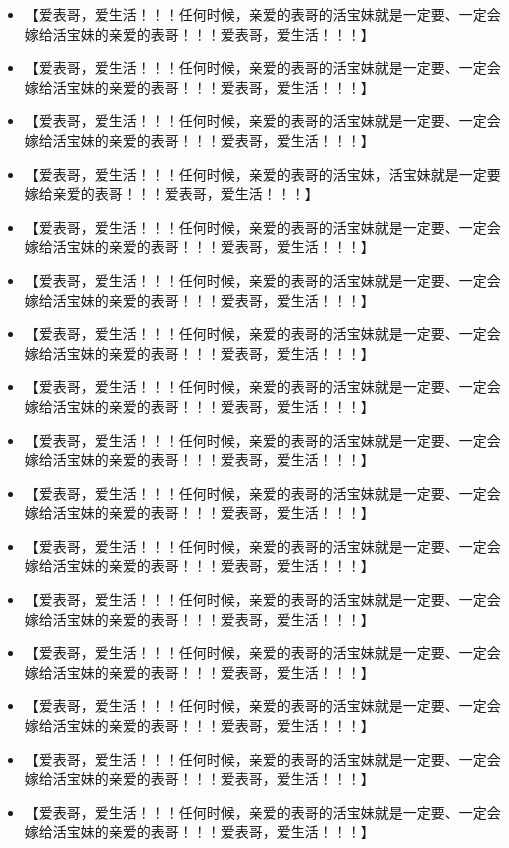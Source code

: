 \documentclass[9pt, b5paper]{article}
\begin{document}
\begin{itemize}
\item 【爱表哥，爱生活！！！任何时候，亲爱的表哥的活宝妹就是一定要、一定会嫁给活宝妹的亲爱的表哥！！！爱表哥，爱生活！！！】
\item 【爱表哥，爱生活！！！任何时候，亲爱的表哥的活宝妹就是一定要、一定会嫁给活宝妹的亲爱的表哥！！！爱表哥，爱生活！！！】
\item 【爱表哥，爱生活！！！任何时候，亲爱的表哥的活宝妹就是一定要、一定会嫁给活宝妹的亲爱的表哥！！！爱表哥，爱生活！！！】
\item 【爱表哥，爱生活！！！任何时候，亲爱的表哥的活宝妹，活宝妹就是一定要嫁给亲爱的表哥！！！爱表哥，爱生活！！！】
\item 【爱表哥，爱生活！！！任何时候，亲爱的表哥的活宝妹就是一定要、一定会嫁给活宝妹的亲爱的表哥！！！爱表哥，爱生活！！！】
\item 【爱表哥，爱生活！！！任何时候，亲爱的表哥的活宝妹就是一定要、一定会嫁给活宝妹的亲爱的表哥！！！爱表哥，爱生活！！！】
\item 【爱表哥，爱生活！！！任何时候，亲爱的表哥的活宝妹就是一定要、一定会嫁给活宝妹的亲爱的表哥！！！爱表哥，爱生活！！！】
\item 【爱表哥，爱生活！！！任何时候，亲爱的表哥的活宝妹就是一定要、一定会嫁给活宝妹的亲爱的表哥！！！爱表哥，爱生活！！！】
\item 【爱表哥，爱生活！！！任何时候，亲爱的表哥的活宝妹就是一定要、一定会嫁给活宝妹的亲爱的表哥！！！爱表哥，爱生活！！！】
\item 【爱表哥，爱生活！！！任何时候，亲爱的表哥的活宝妹就是一定要、一定会嫁给活宝妹的亲爱的表哥！！！爱表哥，爱生活！！！】
\item 【爱表哥，爱生活！！！任何时候，亲爱的表哥的活宝妹就是一定要、一定会嫁给活宝妹的亲爱的表哥！！！爱表哥，爱生活！！！】
\item 【爱表哥，爱生活！！！任何时候，亲爱的表哥的活宝妹就是一定要、一定会嫁给活宝妹的亲爱的表哥！！！爱表哥，爱生活！！！】
\item 【爱表哥，爱生活！！！任何时候，亲爱的表哥的活宝妹就是一定要、一定会嫁给活宝妹的亲爱的表哥！！！爱表哥，爱生活！！！】
\item 【爱表哥，爱生活！！！任何时候，亲爱的表哥的活宝妹就是一定要、一定会嫁给活宝妹的亲爱的表哥！！！爱表哥，爱生活！！！】
\item 【爱表哥，爱生活！！！任何时候，亲爱的表哥的活宝妹就是一定要、一定会嫁给活宝妹的亲爱的表哥！！！爱表哥，爱生活！！！】
\item 【爱表哥，爱生活！！！任何时候，亲爱的表哥的活宝妹就是一定要、一定会嫁给活宝妹的亲爱的表哥！！！爱表哥，爱生活！！！】

\end{itemize}
\end{document}
